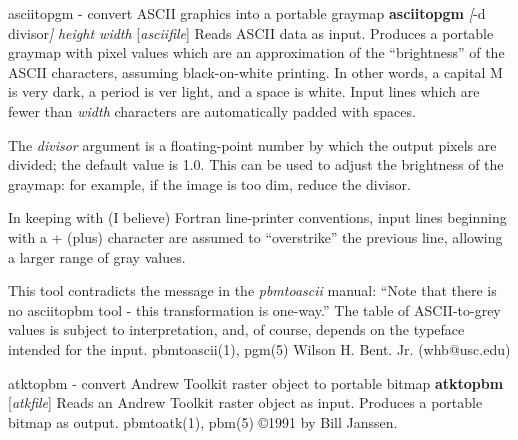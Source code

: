 asciitopgm - convert ASCII graphics into a portable graymap
{\bf asciitopgm}
{\it [}{\rm -d}
{\rm divisor}{\it ]}
{\it height width}
{\rm [}{\it asciifile}{\rm ]}
Reads ASCII data as input.
Produces a portable graymap with pixel values which are an approximation
of the ``brightness'' of the ASCII characters,
assuming black-on-white printing.
In other words, a capital M is very dark, a period is ver light,
and a space is white.
Input lines which are fewer than
{\it width}
characters are automatically padded with spaces.
\par
The
{\it divisor}
argument is a floating-point number by which the output pixels are
divided; the default value is 1.0.
This can be used to adjust the brightness of the graymap:
for example, if the image is too dim, reduce the divisor.
\par
In keeping with (I believe) Fortran line-printer conventions,
input lines beginning with a + (plus) character are assumed
to ``overstrike'' the previous line, allowing a larger range of gray values.
\par
This tool contradicts the message in the
{\it pbmtoascii}
manual: ``Note that there is no asciitopbm tool - this
transformation is one-way.''
The table of ASCII-to-grey values is subject to interpretation,
and, of course, depends on the typeface intended for the input.
pbmtoascii(1), pgm(5)
Wilson H. Bent. Jr. (whb@usc.edu)
%

%

\newpage
%

atktopbm - convert Andrew Toolkit raster object to portable bitmap
{\bf atktopbm}
{\rm [}{\it atkfile}{\rm ]}
Reads an Andrew Toolkit raster object as input.
Produces a portable bitmap as output.
pbmtoatk(1), pbm(5)
\copyright 1991 by Bill Janssen.
%
 
